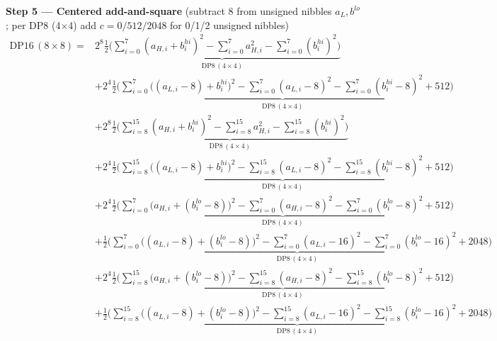 \documentclass[fleqn]{article}
\newcommand{\DPop}[3]{\mathrm{DP#1}\,(#2\!\times\!#3)}
\begin{document}
\textbf{Step 5 --- Centered add-and-square}\quad
{\small(subtract $8$ from unsigned nibbles $a_L,b^{lo}$; per DP8 (4$\times$4) add $c=0/512/2048$ for 0/1/2 unsigned nibbles)}
\begin{align*}
\DPop{16}{8}{8} = {}
  & 2^{8}\underbrace{\tfrac12\Big(\sum_{i=0}^{7}(a_{H,i}{+}b_i^{hi})^2 - \sum_{i=0}^{7}a_{H,i}^2 - \sum_{i=0}^{7}(b_i^{hi})^2\Big)}_{\DPop{8}{4}{4}} \\[0.5em]
  & + 2^{4}\underbrace{\tfrac12\Big(\sum_{i=0}^{7}\big((a_{L,i}{-}8){+}b_i^{hi}\big)^2 - \sum_{i=0}^{7}(a_{L,i}{-}8)^2 - \sum_{i=0}^{7}(b_i^{hi}{-}8)^2 + 512\Big)}_{\DPop{8}{4}{4}} \\[0.5em]
  & + 2^{8}\underbrace{\tfrac12\Big(\sum_{i=8}^{15}(a_{H,i}{+}b_i^{hi})^2 - \sum_{i=8}^{15}a_{H,i}^2 - \sum_{i=8}^{15}(b_i^{hi})^2\Big)}_{\DPop{8}{4}{4}} \\[0.5em]
  & + 2^{4}\underbrace{\tfrac12\Big(\sum_{i=8}^{15}\big((a_{L,i}{-}8){+}b_i^{hi}\big)^2 - \sum_{i=8}^{15}(a_{L,i}{-}8)^2 - \sum_{i=8}^{15}(b_i^{hi}{-}8)^2 + 512\Big)}_{\DPop{8}{4}{4}} \\[0.5em]
  & + 2^{4}\underbrace{\tfrac12\Big(\sum_{i=0}^{7}\big(a_{H,i}{+}(b_i^{lo}{-}8)\big)^2 - \sum_{i=0}^{7}(a_{H,i}{-}8)^2 - \sum_{i=0}^{7}(b_i^{lo}{-}8)^2 + 512\Big)}_{\DPop{8}{4}{4}} \\[0.5em]
  & + \underbrace{\tfrac12\Big(\sum_{i=0}^{7}\big((a_{L,i}{-}8){+}(b_i^{lo}{-}8)\big)^2 - \sum_{i=0}^{7}(a_{L,i}{-}16)^2 - \sum_{i=0}^{7}(b_i^{lo}{-}16)^2 + 2048\Big)}_{\DPop{8}{4}{4}} \\[0.5em]
  & + 2^{4}\underbrace{\tfrac12\Big(\sum_{i=8}^{15}\big(a_{H,i}{+}(b_i^{lo}{-}8)\big)^2 - \sum_{i=8}^{15}(a_{H,i}{-}8)^2 - \sum_{i=8}^{15}(b_i^{lo}{-}8)^2 + 512\Big)}_{\DPop{8}{4}{4}} \\[0.5em]
  & + \underbrace{\tfrac12\Big(\sum_{i=8}^{15}\big((a_{L,i}{-}8){+}(b_i^{lo}{-}8)\big)^2 - \sum_{i=8}^{15}(a_{L,i}{-}16)^2 - \sum_{i=8}^{15}(b_i^{lo}{-}16)^2 + 2048\Big)}_{\DPop{8}{4}{4}}
\end{align*}
\end{document}
